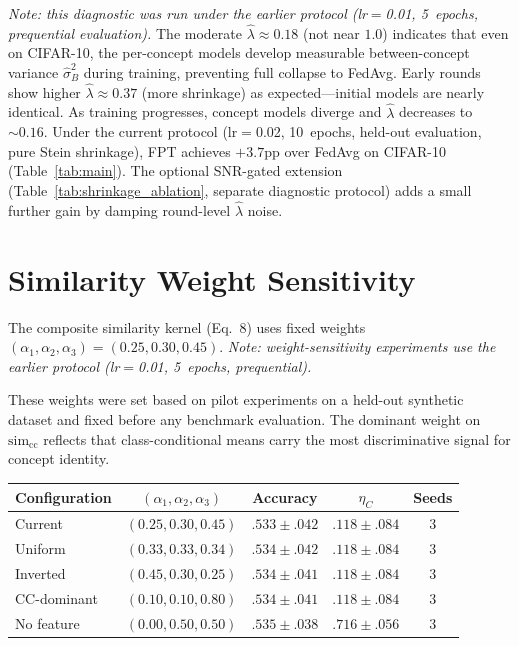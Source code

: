 \documentclass[11pt]{article}
\begin{document}
\noindent \emph{Note: this diagnostic was run under the earlier protocol (lr$=$0.01, 5~epochs, prequential evaluation).}
The moderate $\hat\lambda \approx 0.18$ (not near $1.0$) indicates that even on CIFAR-10, the per-concept models develop measurable between-concept variance $\hat\sigma_B^2$ during training, preventing full collapse to FedAvg.
Early rounds show higher $\hat\lambda \approx 0.37$ (more shrinkage) as expected---initial models are nearly identical.
As training progresses, concept models diverge and $\hat\lambda$ decreases to ${\sim}0.16$.
Under the current protocol (lr$=$0.02, 10~epochs, held-out evaluation, pure Stein shrinkage), FPT achieves $+3.7$pp over FedAvg on CIFAR-10 (Table~\ref{tab:main}). The optional SNR-gated extension (Table~\ref{tab:shrinkage_ablation}, separate diagnostic protocol) adds a small further gain by damping round-level $\hat\lambda$ noise.


\section{Similarity Weight Sensitivity}
\label{app:weight_sensitivity}

The composite similarity kernel (Eq.~8) uses fixed weights $(\alpha_1, \alpha_2, \alpha_3) = (0.25, 0.30, 0.45)$.
\emph{Note: weight-sensitivity experiments use the earlier protocol (lr$=$0.01, 5~epochs, prequential).}

These weights were set based on pilot experiments on a held-out synthetic dataset and fixed before any benchmark evaluation.
The dominant weight on $\mathrm{sim}_{\mathrm{cc}}$ reflects that class-conditional means carry the most discriminative signal for concept identity.

\begin{center}
\small
\begin{tabular}{lcccc}
\toprule
Configuration & $(\alpha_1, \alpha_2, \alpha_3)$ & Accuracy & $\eta_C$ & Seeds \\
\midrule
Current & $(0.25, 0.30, 0.45)$ & $.533 \pm .042$ & $.118 \pm .084$ & 3 \\
Uniform & $(0.33, 0.33, 0.34)$ & $.534 \pm .042$ & $.118 \pm .084$ & 3 \\
Inverted & $(0.45, 0.30, 0.25)$ & $.534 \pm .041$ & $.118 \pm .084$ & 3 \\
CC-dominant & $(0.10, 0.10, 0.80)$ & $.534 \pm .041$ & $.118 \pm .084$ & 3 \\
No feature & $(0.00, 0.50, 0.50)$ & $.535 \pm .038$ & $.716 \pm .056$ & 3 \\
\bottomrule
\end{tabular}
\end{center}
\end{document}
